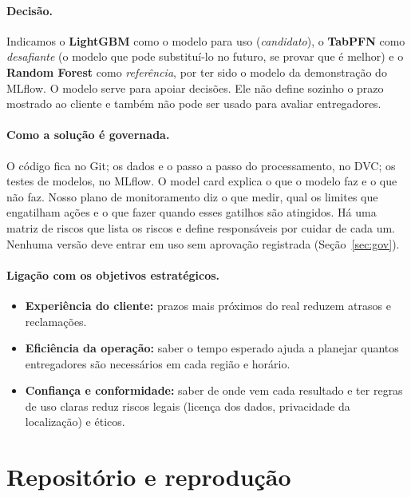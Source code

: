 \documentclass[11pt,a4paper]{article}
\begin{document}
\paragraph{Decisão.} Indicamos o \textbf{LightGBM} como o modelo para uso (\emph{candidato}),
o \textbf{TabPFN} como \emph{desafiante} (o modelo que pode substituí-lo no futuro, se provar
que é melhor) e o \textbf{Random Forest} como \emph{referência}, por ter sido o modelo da
demonstração do MLflow. O modelo serve para apoiar decisões. Ele não define sozinho o prazo
mostrado ao cliente e também não pode ser usado para avaliar entregadores.

\paragraph{Como a solução é governada.} O código fica no Git; os dados e o passo a passo do
processamento, no DVC; os testes de modelos, no MLflow. O model card explica o que o modelo
faz e o que não faz. Nosso plano de monitoramento diz o que medir, qual os limites que engatilham ações
e o que fazer quando esses gatilhos são atingidos.
Há uma matriz de riscos que lista os riscos e define responsáveis por cuidar de cada um. 
Nenhuma versão deve entrar em uso sem aprovação registrada (Seção~\ref{sec:gov}).

\paragraph{Ligação com os objetivos estratégicos.}
\begin{itemize}
  \item \textbf{Experiência do cliente:} prazos mais próximos do real reduzem atrasos e
        reclamações.
  \item \textbf{Eficiência da operação:} saber o tempo esperado ajuda a planejar quantos
        entregadores são necessários em cada região e horário.
  \item \textbf{Confiança e conformidade:} saber de onde vem cada resultado e ter regras de uso
        claras reduz riscos legais (licença dos dados, privacidade da localização) e éticos.
\end{itemize}

\section{Repositório e reprodução}
\label{sec:repo}
\end{document}
